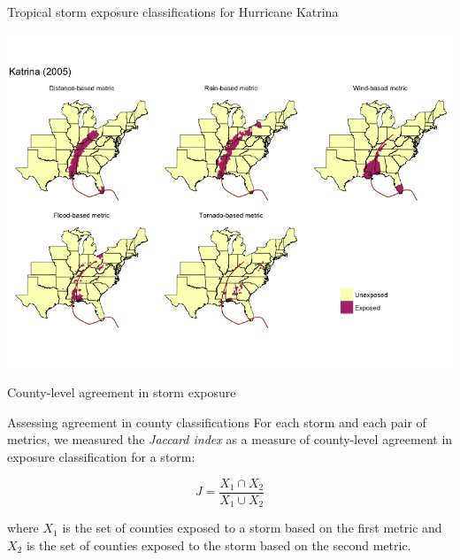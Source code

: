 \documentclass[ignorenonframetext,]{beamer}
\begin{document}
\begin{frame}{Tropical storm exposure classifications for Hurricane
Katrina}

\begin{center}\includegraphics[width=\textwidth]{figures/katrina_all_exposures} \end{center}

\end{frame}

\begin{frame}{County-level agreement in storm exposure}

\begin{block}{Assessing agreement in county classifications}
For each storm and each pair of metrics, we measured the \textit{Jaccard index} as a measure of county-level agreement in exposure classification for a storm:

\begin{equation*}
J = \frac{X_1 \cap X_2}{X_1 \cup X_2}
\end{equation*}

where $X_1$ is the set of counties exposed to a storm based on the first metric and $X_2$ is the set of counties exposed to the storm based on the second metric. 

\end{block}

\end{frame}
\end{document}
